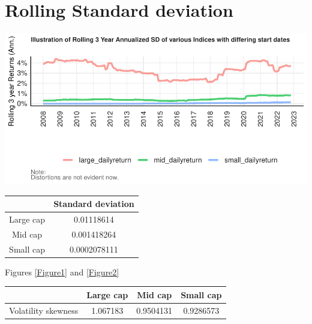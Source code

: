 \documentclass[11pt,preprint, authoryear]{elsarticle}
\let\origfigure\figure
\let\endorigfigure\endfigure
\renewenvironment{figure}[1][2] {
    \expandafter\origfigure\expandafter[H]
} {
    \endorigfigure
}
\let\origtable\table
\let\endorigtable\endtable
\renewenvironment{table}[1][2] {
    \expandafter\origtable\expandafter[H]
} {
    \endorigtable
}
\numberwithin{equation}{section}
\numberwithin{figure}{section}
\numberwithin{table}{section}
\begin{document}
\hypertarget{rolling-standard-deviation}{%
\section{\texorpdfstring{Rolling Standard deviation
\label{Standard deviation}}{Rolling Standard deviation }}\label{rolling-standard-deviation}}

\begin{figure}[H]

{\centering \includegraphics{Volatility-of-Shares_files/figure-latex/Figure10-1} 

}

\caption{Caption Here \label{Figure10}}\label{fig:Figure10}
\end{figure}

\begin{table}[h]
\begin{center}
    \begin{tabular}{| c | c |}
    \hline
         & Standard deviation \\
        \hline
        Large cap & 0.01118614 \\
        Mid cap & 0.001418264 \\
        Small cap & 0.0002078111 \\
        \hline
    \end{tabular}
    \caption{Standard deviation}
    \label{tab:SD}
\end{center}
\end{table}

Figures \ref{Figure1} and \ref{Figure2}

\begin{table}[h]
\begin{center}
    \begin{tabular}{| c | c | c | c |}
    \hline
         & Large cap & Mid cap & Small cap \\
        \hline
        Volatility skewness & 1.067183 & 0.9504131 & 0.9286573 \\
        \hline
    \end{tabular}
    \caption{Volatility skewness}
    \label{tab:VS}
\end{center}
\end{table}
\end{document}
